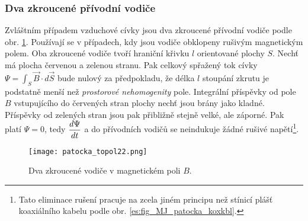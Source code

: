       \subsubsection{Dva zkroucené přívodní vodiče}
        Zvláštním případem vzduchové cívky jsou dva zkroucené přívodní vodiče podle obr. 
        \ref{es:fig_patocka_topol22}. Používají se v případech, kdy jsou vodiče obklopeny rušivým 
        magnetickým polem. Oba zkroucené vodiče tvoří hraniční křivku \(l\) orientované plochy 
        \(S\). Nechť má plocha červenou a zelenou stranu. Pak celkový spřažený tok cívky  \(\Psi = 
        \int_S\vec{B}\cdot d\vec{S}\) bude nulový za předpokladu, že délka \(l\) stoupání zkrutu je 
        podstatně menší než \emph{prostorové nehomogenity} pole. Integrální příspěvky od pole \(B\) 
        vstupujícího do červených stran plochy nechť jsou brány jako kladné. Příspěvky od zelených 
        stran jsou pak přibližně stejně velké, ale záporné. Pak platí \(\Psi = 0\), tedy 
        \(\dfrac{d \Psi}{d t}\) a do přívodních vodičů se neindukuje žádné rušivé napětí\footnote{Tato 
        eliminace rušení pracuje na zcela jiném principu než stínicí plášť koaxiálního kabelu podle 
        obr. \ref{es:fig_MJ_patocka_koxkbl}.}.
        \begin{figure}[ht!]
          \centering  
          \texttt{[image: patocka\_topol22.png]}
          \caption{Dva zkroucené vodiče v magnetickém poli \(B\). \cite[s.~59]{Patocka4}} 
          \label{es:fig_patocka_topol22}
        \end{figure}
        
